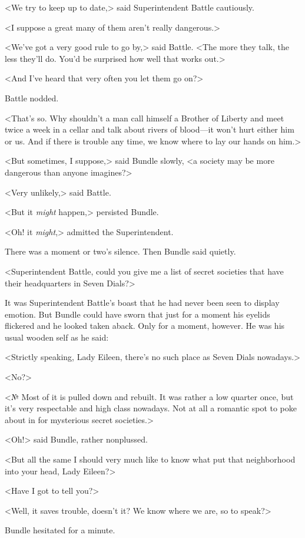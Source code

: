 <We try to keep up to date,> said Superintendent Battle cautiously.

<I suppose a great many of them aren't really dangerous.>

<We've got a very good rule to go by,> said Battle. <The more they talk, the less they'll do. You'd be surprised how well that works out.>

<And I've heard that very often you let them go on?>

Battle nodded.

<That's so. Why shouldn't a man call himself a Brother of Liberty and meet twice a week in a cellar and talk about rivers of blood—it won't hurt either him or us. And if there is trouble any time, we know where to lay our hands on him.>

<But sometimes, I suppose,> said Bundle slowly, <a society may be more dangerous than anyone imagines?>

<Very unlikely,> said Battle.

<But it \emph{might} happen,> persisted Bundle.

<Oh! it \emph{might},> admitted the Superintendent.

There was a moment or two's silence. Then Bundle said quietly.

<Superintendent Battle, could you give me a list of secret societies that have their headquarters in Seven Dials?>

It was Superintendent Battle's boast that he had never been seen to display emotion. But Bundle could have sworn that just for a moment his eyelids flickered and he looked taken aback. Only for a moment, however. He was his usual wooden self as he said:

<Strictly speaking, Lady Eileen, there's no such place as Seven Dials nowadays.>

<No?>

<№ Most of it is pulled down and rebuilt. It was rather a low quarter once, but it's very respectable and high class nowadays. Not at all a romantic spot to poke about in for mysterious secret societies.>

<Oh!> said Bundle, rather nonplussed.

<But all the same I should very much like to know what put that neighborhood into your head, Lady Eileen?>

<Have I got to tell you?>

<Well, it saves trouble, doesn't it? We know where we are, so to speak?>

Bundle hesitated for a minute.

